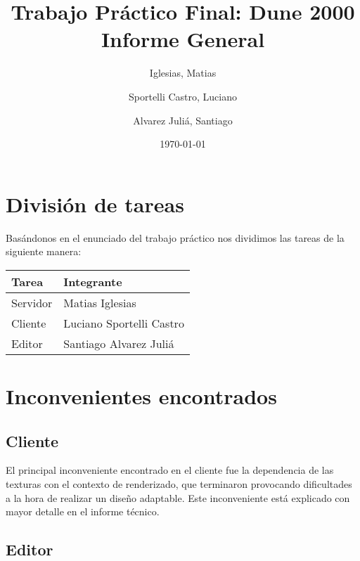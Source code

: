 \documentclass[titlepage,a4paper,12pt]{article}
\title{ Trabajo Práctico Final: Dune 2000 \\
 \large{Informe General}}
\author{Iglesias, Matias \and Sportelli Castro, Luciano \and Alvarez Juliá, Santiago}
\date{ \today }
\begin{document}
\maketitle

\tableofcontents %

\newpage
\section{División de tareas}

Basándonos en el enunciado del trabajo práctico nos dividimos las tareas de la siguiente manera:\\

\begin{center}
    \begin{tabular}{ | l | l |}
    \hline
    Tarea & Integrante \\ \hline
    Servidor & Matias Iglesias  \\ \hline
    Cliente & Luciano Sportelli Castro \\ \hline
    Editor & Santiago Alvarez Juliá \\
    \hline
    \end{tabular}
\end{center}

\section{Inconvenientes encontrados}

\subsection{Cliente}
El principal inconveniente encontrado en el cliente fue la dependencia de las texturas con el contexto de renderizado, que terminaron provocando dificultades a la hora de realizar un diseño adaptable. Este inconveniente está explicado con mayor detalle en el informe técnico.

\subsection{Editor}
\end{document}
